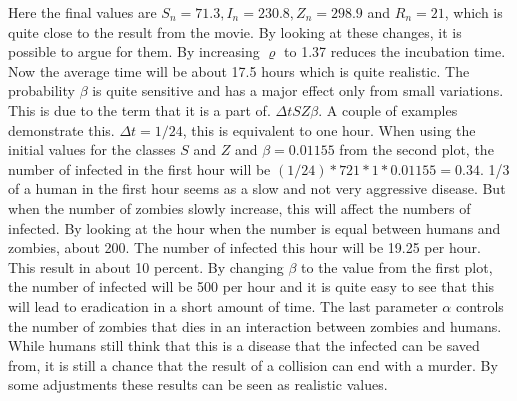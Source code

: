 \documentclass[%
twoside,                 %
final,                   %
10pt]{article}
\begin{document}
Here the final values are $S_n=71.3,I_n=230.8,Z_n=298.9$ and $R_n=21$, which is quite close to the result from the movie. By looking at these changes, it is possible to argue for them. By increasing $\varrho$ to 1.37 reduces the incubation time. Now the average time will be about 17.5 hours which is quite realistic. The probability $\beta$ is quite sensitive and has a major effect only from small variations. This is due to the term that it is a part of. $\Delta t SZ \beta$. A couple of examples demonstrate this. $\Delta t = 1/24$, this is equivalent to one hour. When using the initial values for the classes $S$ and $Z$ and $\beta=0.01155$ from the second plot, the number of infected in the first hour will be $(1/24)*721*1*0.01155=0.34$. 1/3 of a human in the first hour seems as a slow and not very aggressive disease. But when the number of zombies slowly increase, this will affect the numbers of infected. By looking at the hour when the number is equal between humans and zombies, about 200. The number of infected this hour will be 19.25 per hour. This result in about 10 percent. By changing $\beta$ to the value from the first plot, the number of infected will be 500 per hour and it is quite easy to see that this will lead to eradication in a short amount of time. The last parameter $\alpha$ controls the number of zombies that dies in an interaction between zombies and humans. While humans still think that this is a disease that the infected can be saved from, it is still a chance that the result of a collision can end with a murder. By some adjustments these results can be seen as realistic values.
\end{document}
